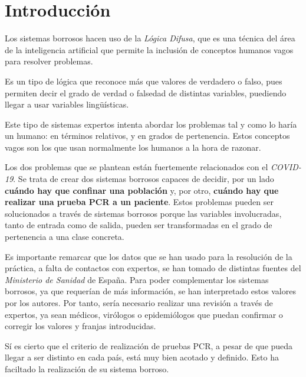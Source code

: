 \documentclass[12pt,a4paper, xcolor=table]{article}
\begin{document}
\section{Introducción}

Los sistemas borrosos hacen uso de la \textit{Lógica Difusa}, que es una técnica del área de la inteligencia artificial que permite la inclusión de conceptos humanos vagos para resolver problemas\cite{fuzzy}.

\vspace{2mm}

Es un tipo de lógica que reconoce más que valores de verdadero o falso, pues permiten decir el grado de verdad o falsedad de distintas variables, puediendo llegar a usar variables lingüísticas\cite{fuzzygame}.

\vspace{3mm}

Este tipo de sistemas expertos intenta abordar los problemas tal y como lo haría un humano: en términos relativos, y en grados de pertenencia. Estos conceptos vagos son los que usan normalmente los humanos a la hora de razonar.

\vspace{3mm}

Los dos problemas que se plantean están fuertemente relacionados con el \textit{COVID-19}. Se trata de crear dos sistemas borrosos capaces de decidir, por un lado \textbf{cuándo hay que confinar una población} y, por otro, \textbf{cuándo hay que realizar una prueba PCR a un paciente}. Estos problemas pueden ser solucionados a través de sistemas borrosos porque las variables involucradas, tanto de entrada como de salida, pueden ser transformadas en el grado de pertenencia a una clase concreta.

\vspace{4mm}

Es importante remarcar que los datos que se han usado para la resolución de la práctica, a falta de contactos con expertos, se han tomado de distintas fuentes del \textit{Ministerio de Sanidad}\cite{poblacion, paciente} de España. Para poder complementar los sistemas borrosos, ya que requerían de más información, se han interpretado estos valores por los autores. Por tanto, sería necesario realizar una revisión a través de expertos, ya sean médicos, virólogos o epidemiólogos que puedan confirmar o corregir los valores y franjas introducidas.

\vspace{3mm}

Sí es cierto que el criterio de realización de pruebas PCR, a pesar de que pueda llegar a ser distinto en cada país, está muy bien acotado y definido. Esto ha faciltado la realización de su sistema borroso.
\end{document}
